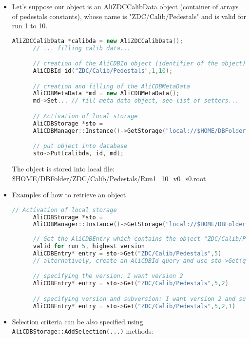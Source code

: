 \documentclass[12pt,a4paper,twoside]{article}
\newcommand{\method}[1]{\texttt{#1}\xspace}
\begin{document}
{\begin{itemize}
  \begin{itemize}
  \item Let's suppose our object is an AliZDCCalibData object (container of 
    arrays of pedestals constants), whose name is 
    "ZDC/Calib/Pedestals" and is valid for run 1 to 10. 
    
    \begin{lstlisting}[language=C++]
      AliZDCCalibData *calibda = new AliZDCCalibData();
      // ... filling calib data...

      // creation of the AliCDBId object (identifier of the object)
      AliCDBId id("ZDC/Calib/Pedestals",1,10);

      // creation and filling of the AliCDBMetaData
      AliCDBMetaData *md = new AliCDBMetaData();
      md->Set... // fill meta data object, see list of setters...

      // Activation of local storage
      AliCDBStorage *sto = 
      AliCDBManager::Instance()->GetStorage("local://$HOME/DBFolder");

      // put object into database
      sto->Put(calibda, id, md);
    \end{lstlisting}
    The object is stored into local file: 
    \$HOME/DBFolder/ZDC/Calib/Pedestals/Run1\_10\_v0\_s0.root

  \item Examples of how to retrieve an object

    \begin{lstlisting}[language=C++]
      // Activation of local storage
      AliCDBStorage *sto =
      AliCDBManager::Instance()->GetStorage("local://$HOME/DBFolder");
      
      // Get the AliCDBEntry which contains the object "ZDC/Calib/Pedestals", 
      valid for run 5, highest version
      AliCDBEntry* entry = sto->Get("ZDC/Calib/Pedestals",5)
      // alternatively, create an AliCDBId query and use sto->Get(query) ...

      // specifying the version: I want version 2
      AliCDBEntry* entry = sto->Get("ZDC/Calib/Pedestals",5,2)

      // specifying version and subversion: I want version 2 and subVersion 1
      AliCDBEntry* entry = sto->Get("ZDC/Calib/Pedestals",5,2,1)
    \end{lstlisting}

  \item Selection criteria can be also specified using 
    \method{AliCDBStorage::AddSelection(...)} methods:


\end{itemize}
\end{itemize}}
\end{document}
